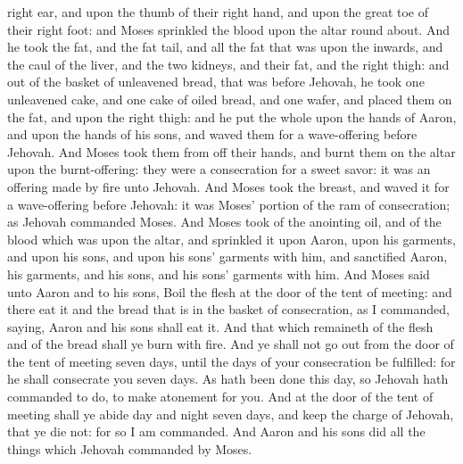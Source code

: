 right ear, and upon the thumb of their right hand, and upon the great toe of their right foot: and Moses sprinkled the blood upon the altar round about. And he took the fat, and the fat tail, and all the fat that was upon the inwards, and the caul of the liver, and the two kidneys, and their fat, and the right thigh: and out of the basket of unleavened bread, that was before Jehovah, he took one unleavened cake, and one cake of oiled bread, and one wafer, and placed them on the fat, and upon the right thigh: and he put the whole upon the hands of Aaron, and upon the hands of his sons, and waved them for a wave-offering before Jehovah. And Moses took them from off their hands, and burnt them on the altar upon the burnt-offering: they were a consecration for a sweet savor: it was an offering made by fire unto Jehovah. And Moses took the breast, and waved it for a wave-offering before Jehovah: it was Moses’ portion of the ram of consecration; as Jehovah commanded Moses.  And Moses took of the anointing oil, and of the blood which was upon the altar, and sprinkled it upon Aaron, upon his garments, and upon his sons, and upon his sons’ garments with him, and sanctified Aaron, his garments, and his sons, and his sons’ garments with him.  And Moses said unto Aaron and to his sons, Boil the flesh at the door of the tent of meeting: and there eat it and the bread that is in the basket of consecration, as I commanded, saying, Aaron and his sons shall eat it. And that which remaineth of the flesh and of the bread shall ye burn with fire. And ye shall not go out from the door of the tent of meeting seven days, until the days of your consecration be fulfilled: for he shall consecrate you seven days. As hath been done this day, so Jehovah hath commanded to do, to make atonement for you. And at the door of the tent of meeting shall ye abide day and night seven days, and keep the charge of Jehovah, that ye die not: for so I am commanded. And Aaron and his sons did all the things which Jehovah commanded by Moses. 

